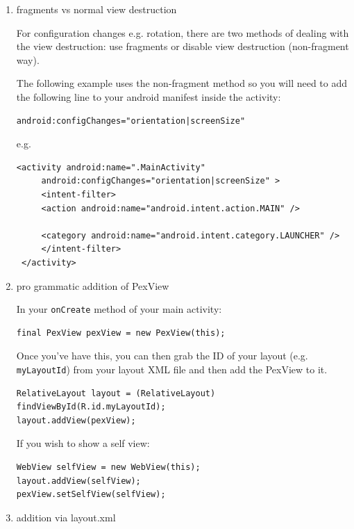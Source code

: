 \documentclass[a4paper,11pt]{article}
\begin{document}
\begin{enumerate}
\item fragments vs normal view destruction
\label{sec:orgheadline62}

For configuration changes e.g. rotation, there are two methods of
dealing with the view destruction: use fragments or disable view
destruction (non-fragment way).

The following example uses the non-fragment method so you will need to
add the following line to your android manifest inside the activity:

\begin{verbatim}
android:configChanges="orientation|screenSize"
\end{verbatim}

e.g.

\begin{verbatim}
<activity android:name=".MainActivity"
     android:configChanges="orientation|screenSize" >
     <intent-filter>
     <action android:name="android.intent.action.MAIN" />

     <category android:name="android.intent.category.LAUNCHER" />
     </intent-filter>
 </activity>
\end{verbatim}

\item pro grammatic addition of PexView
\label{sec:orgheadline63}

In your \texttt{onCreate} method of your main activity:

\begin{verbatim}
final PexView pexView = new PexView(this);
\end{verbatim}

Once you've have this, you can then grab the ID of your layout
(e.g. \texttt{myLayoutId}) from your layout XML file and then add the PexView
to it.

\begin{verbatim}
RelativeLayout layout = (RelativeLayout) findViewById(R.id.myLayoutId);
layout.addView(pexView);
\end{verbatim}

If you wish to show a self view:

\begin{verbatim}
WebView selfView = new WebView(this);
layout.addView(selfView);
pexView.setSelfView(selfView);
\end{verbatim}

\item addition via layout.xml
\label{sec:orgheadline64}


\end{enumerate}
\end{document}
